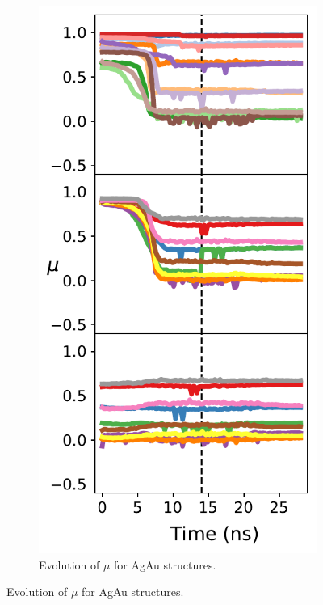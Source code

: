 \begin{figure}
    \centering
\begin{subfigure}{0.39\textwidth}
    \centering
    \includegraphics[width=\linewidth]{figures/MD/Alloys/Mix_Ag-Au.pdf}
    \caption{Evolution of $\mu$ for AgAu structures.}

\end{subfigure}
\end{figure}
